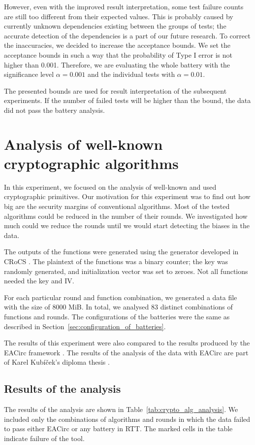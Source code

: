 \documentclass[
	digital,    %
	oneside,    %
	color,
	11pt,
	nocover,
	notable,
	nolof,
	nolot,
]{fithesis3}
\theoremstyle{definition}
\theoremstyle{remark}
\begin{document}
However, even with the improved result interpretation, some test failure counts are still too different from their expected values. This is probably caused by currently unknown dependencies existing between the groups of tests; the accurate detection of the dependencies is a part of our future research. To correct the inaccuracies, we decided to increase the acceptance bounds. We set the acceptance bounds in such a way that the probability of Type I error is not higher than 0.001. Therefore, we are evaluating the whole battery with the significance level $\alpha=0.001$ and the individual tests with $\alpha=0.01$.

The presented bounds are used for result interpretation of the subsequent experiments. If the number of failed tests will be higher than the bound, the data did not pass the battery analysis.

\section{Analysis of well-known cryptographic algorithms}
\label{sec:usable_testbed}
In this experiment, we focused on the analysis of well-known and used cryptographic primitives. Our motivation for this experiment was to find out how big are the security margins of conventional algorithms. Most of the tested algorithms could be reduced in the number of their rounds. We investigated how much could we reduce the rounds until we would start detecting the biases in the data.

The outputs of the functions were generated using the generator developed in CRoCS \cite{eacirc-streams}. The plaintext of the functions was a binary counter; the key was randomly generated, and initialization vector was set to zeroes. Not all functions needed the key and IV. 

For each particular round and function combination, we generated a data file with the size of 8000 MiB. In total,  we analysed 83 distinct combinations of functions and rounds. The configurations of the batteries were the same as described in Section~\ref{sec:configuration_of_batteries}. 

The results of this experiment were also compared to the results produced by the EACirc framework \cite{eacirc-github}. The results of the analysis of the data with EACirc are part of Karel Kubíček's diploma thesis \cite{kubicek-dp}.

\subsection{Results of the analysis}
The results of the analysis are shown in Table~\ref{tab:crypto_alg_analysis}. We included only the combinations of algorithms and rounds in which the data failed to pass either EACirc or any battery in RTT. The marked cells in the table indicate failure of the tool. 
\end{document}
